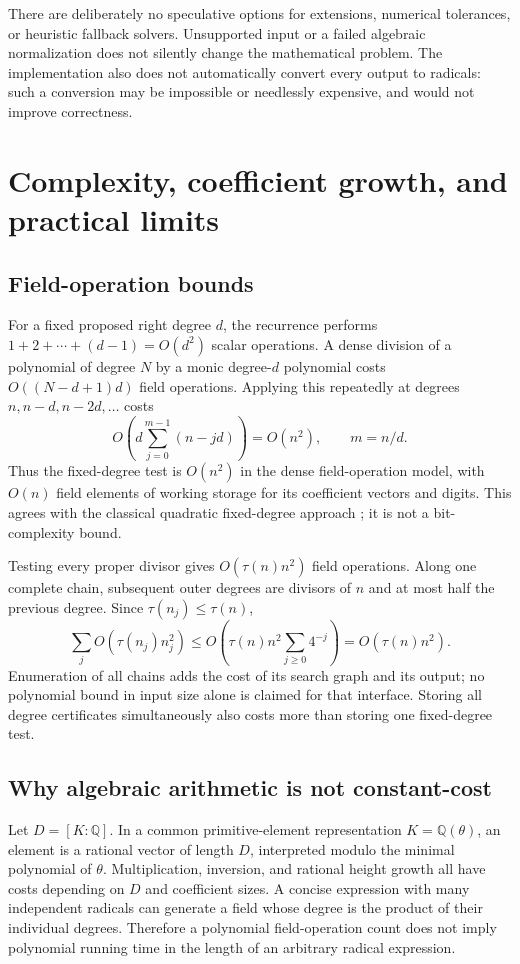 \documentclass[11pt,a4paper]{article}
\numberwithin{equation}{section}
\theoremstyle{definition}
\theoremstyle{remark}
\newcommand{\Q}{\mathbb{Q}}
\begin{document}
There are deliberately no speculative options for extensions, numerical
tolerances, or heuristic fallback solvers. Unsupported input or a failed
algebraic normalization does not silently change the mathematical problem.
The implementation also does not automatically convert every output to
radicals: such a conversion may be impossible or needlessly expensive, and
would not improve correctness.

\section{Complexity, coefficient growth, and practical limits}
\label{sec:complexity}
\subsection{Field-operation bounds}
For a fixed proposed right degree $d$, the recurrence performs
$1+2+\cdots+(d-1)=O(d^2)$ scalar operations. A dense division of a polynomial
of degree $N$ by a monic degree-$d$ polynomial costs $O((N-d+1)d)$ field
operations. Applying this repeatedly at degrees $n,n-d,n-2d,\ldots$ costs
\[
 O\!\left(d\sum_{j=0}^{m-1}(n-jd)\right)=O(n^2),
 \qquad m=n/d.
\]
Thus the fixed-degree test is $O(n^2)$ in the dense field-operation model,
with $O(n)$ field elements of working storage for its coefficient vectors and
digits. This agrees with the classical quadratic fixed-degree approach
\cite{KL}; it is not a bit-complexity bound.

Testing every proper divisor gives $O(\tau(n)n^2)$ field operations. Along
one complete chain, subsequent outer degrees are divisors of $n$ and at most
half the previous degree. Since $\tau(n_j)\le\tau(n)$,
\[
 \sum_j O(\tau(n_j)n_j^2)
 \le O\!\left(\tau(n)n^2\sum_{j\ge0}4^{-j}\right)
 =O(\tau(n)n^2).
\]
Enumeration of all chains adds the cost of its search graph and its output;
no polynomial bound in input size alone is claimed for that interface.
Storing all degree certificates simultaneously also costs more than storing
one fixed-degree test.

\subsection{Why algebraic arithmetic is not constant-cost}
Let $D=[K:\Q]$. In a common primitive-element representation $K=\Q(\theta)$,
an element is a rational vector of length $D$, interpreted modulo the minimal
polynomial of $\theta$. Multiplication, inversion, and rational height growth
all have costs depending on $D$ and coefficient sizes. A concise expression
with many independent radicals can generate a field whose degree is the
product of their individual degrees. Therefore a polynomial field-operation
count does not imply polynomial running time in the length of an arbitrary
radical expression.
\end{document}
